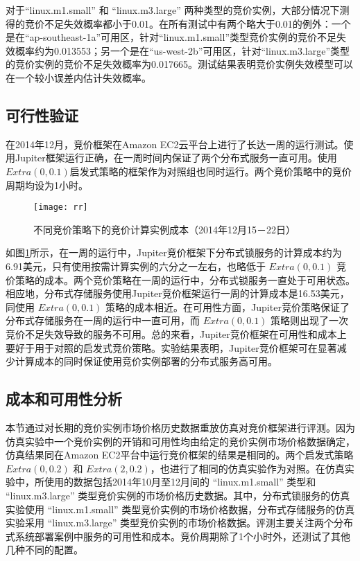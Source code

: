 对于``linux.m1.small'' 和 ``linux.m3.large'' 两种类型的竞价实例，大部分情况下测得的竞价不足失效概率都小于0.01。在所有测试中有两个略大于0.01的例外：一个是在``ap-southeast-1a''可用区，针对``linux.m1.small''类型竞价实例的竞价不足失效概率约为0.013553；另一个是在``us-west-2b''可用区，针对``linux.m3.large''类型的竞价实例的竞价不足失效概率为0.017665。测试结果表明竞价实例失效模型可以在一个较小误差内估计失效概率。

\subsection{可行性验证}
在2014年12月，竞价框架在Amazon EC2云平台上进行了长达一周的运行测试。使用Jupiter框架运行正确，在一周时间内保证了两个分布式服务一直可用。使用$Extra(0, 0.1)$启发式策略的框架作为对照组也同时运行。两个竞价策略中的竞价周期均设为1小时。
\begin{figure}
  \centering
  \texttt{[image: rr]}
  \caption{不同竞价策略下的竞价计算实例成本（2014年12月15－22日）}
  \label{figure:rr}
\end{figure}

如图\ref{figure:rr}所示，在一周的运行中，Jupiter竞价框架下分布式锁服务的计算成本约为6.91美元，只有使用按需计算实例的六分之一左右，也略低于 $Extra(0, 0.1)$ 竞价策略的成本。两个竞价策略在一周的运行中，分布式锁服务一直处于可用状态。相应地，分布式存储服务使用Jupiter竞价框架运行一周的计算成本是16.53美元，同使用 $Extra(0, 0.1)$ 策略的成本相近。在可用性方面，Jupiter竞价策略保证了分布式存储服务在一周的运行中一直可用，而 $Extra(0, 0.1)$ 策略则出现了一次竞价不足失效导致的服务不可用。总的来看，Jupiter竞价框架在可用性和成本上要好于用于对照的启发式竞价策略。实验结果表明，Jupiter竞价框架可在显著减少计算成本的同时保证使用竞价实例部署的分布式服务高可用。

\subsection{成本和可用性分析}
\label{subsec:ca}
本节通过对长期的竞价实例市场价格历史数据重放仿真对竞价框架进行评测。因为仿真实验中一个竞价实例的开销和可用性均由给定的竞价实例市场价格数据确定，仿真结果同在Amazon EC2平台中运行竞价框架的结果是相同的。两个启发式策略 $Extra(0, 0.2)$ 和 $Extra(2, 0.2)$，也进行了相同的仿真实验作为对照。在仿真实验中，所使用的数据包括2014年10月至12月间的 ``linux.m1.small'' 类型和 ``linux.m3.large'' 类型竞价实例的市场价格历史数据。其中，分布式锁服务的仿真实验使用 ``linux.m1.small'' 类型竞价实例的市场价格数据，分布式存储服务的仿真实验采用 ``linux.m3.large'' 类型竞价实例的市场价格数据。评测主要关注两个分布式系统部署案例中服务的可用性和成本。竞价周期除了1个小时外，还测试了其他几种不同的配置。

